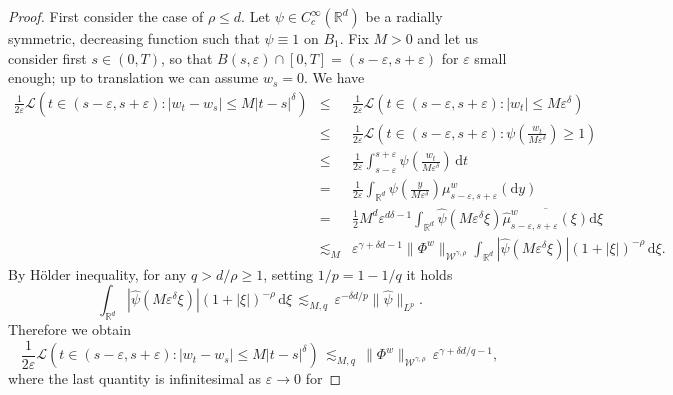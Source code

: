 \documentclass[10pt]{article}
\newcommand{\comma}{{,}}
\newcommand{\mathd}{\mathrm{d}}
\begin{document}
\begin{proof}
  First consider the case of $\rho \leqslant d$. Let $\psi \in C^{\infty}_c
  (\mathbb{R}^d)$ be a radially symmetric, decreasing function such that $\psi
  \equiv 1$ on $B_1$. Fix $M > 0$ and let us consider first $s \in (0, T)$, so
  that $B (s, \varepsilon) \cap [0, T] = (s - \varepsilon, s + \varepsilon)$
  for $\varepsilon$ small enough; up to translation we can assume $w_s = 0$.
  We have
  \begin{eqnarray*}
    \frac{1}{2 \varepsilon} \mathcal{L} (t \in (s - \varepsilon, s +
    \varepsilon) : | w_t - w_s | \leqslant M | t - s |^{\delta}) & \leqslant &
    \frac{1}{2 \varepsilon} \mathcal{L} (t \in (s - \varepsilon, s +
    \varepsilon) : | w_t | \leqslant M \varepsilon^{\delta})\\
    & \leqslant & \frac{1}{2 \varepsilon} \mathcal{L} \left( t \in (s -
    \varepsilon, s + \varepsilon) : \psi \left( \frac{w_t}{M
    \varepsilon^{\delta}} \right) \geqslant 1 \right)\\
    & \leqslant & \frac{1}{2 \varepsilon} \int_{s - \varepsilon}^{s +
    \varepsilon} \psi \left( \frac{w_t}{M \varepsilon^{\delta}} \right) \,
    \mathd t\\
    & = & \frac{1}{2 \varepsilon} \int_{\mathbb{R}^d} \psi \left( \frac{y}{M
    \varepsilon^{\delta}} \right) \mu_{s - \varepsilon, s + \varepsilon}^w
    (\mathd y)\\
    & = & \frac{1}{2} M^d \varepsilon^{d \delta - 1} \int_{\mathbb{R}^d}
    \hat{\psi} (M \varepsilon^{\delta} \xi) \overline{\hat{\mu}_{s -
    \varepsilon, s + \varepsilon}^w (\xi)} \mathd \xi\\
    & \lesssim_M & \varepsilon^{\gamma + \delta d - 1} \| \Phi^w
    \|_{\mathcal{W}^{\gamma \comma \rho}} \int_{\mathbb{R}^d} | \hat{\psi} (M
    \varepsilon^{\delta} \xi) |  (1 + | \xi |)^{- \rho} \, \mathd \xi .
  \end{eqnarray*}
  By H\"{o}lder inequality, for any $q > d / \rho \geqslant 1$, setting $1 / p
  = 1 - 1 / q$ it holds
  \[ \int_{\mathbb{R}^d} | \hat{\psi} (M \varepsilon^{\delta} \xi) |  (1 + |
     \xi |)^{- \rho} \, \mathd \xi \, \lesssim_{M, q} \, \varepsilon^{- \delta
     d / p}  \| \hat{\psi} \|_{L^p} . \]
  Therefore we obtain
  \[ \frac{1}{2 \varepsilon} \mathcal{L} (t \in (s - \varepsilon, s +
     \varepsilon) : | w_t - w_s | \leqslant M | t - s |^{\delta}) \,
     \lesssim_{M, q} \, \| \Phi^w \|_{\mathcal{W}^{\gamma \comma \rho}} \,
     \varepsilon^{\gamma + \delta d / q - 1}, \]
  where the last quantity is infinitesimal as $\varepsilon \rightarrow 0$ for

\end{proof}
\end{document}
